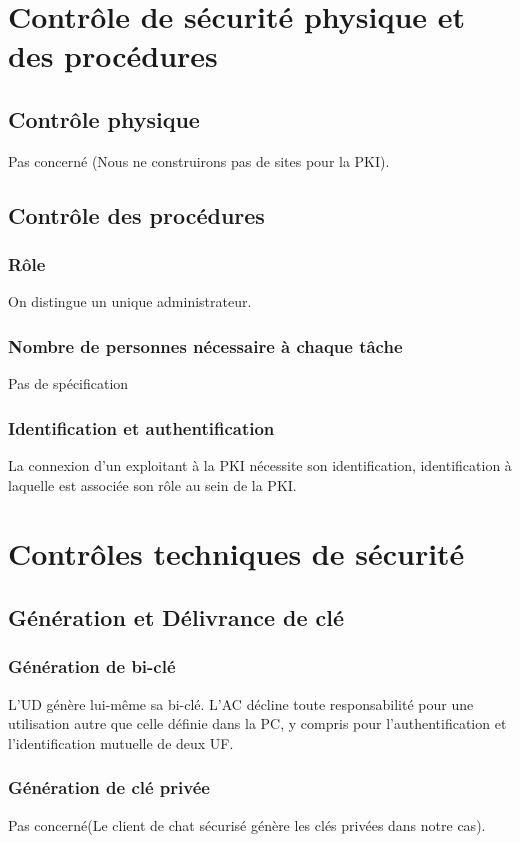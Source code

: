 \documentclass[a4paper,11pt,french]{article}
\begin{document}
\section{Contrôle de sécurité physique et des procédures}
\subsection{Contrôle physique}
Pas concerné (Nous ne construirons pas de sites pour la PKI).
\subsection{Contrôle des procédures}
\subsubsection{Rôle}
On distingue un unique administrateur.

\subsubsection{Nombre de personnes nécessaire à chaque tâche}
Pas de spécification

\subsubsection{Identification et authentification}
La connexion d'un exploitant à la PKI nécessite son identification, identification à laquelle est associée son rôle au sein de la PKI.

\section{Contrôles techniques de sécurité}

\subsection{Génération et Délivrance de clé}
\subsubsection{Génération de bi-clé}
L'UD génère lui-même sa bi-clé. L'AC décline toute responsabilité pour une utilisation autre que celle définie dans la PC, y
compris pour l'authentification et l'identification mutuelle de deux UF. 
\subsubsection{Génération de clé privée}
Pas concerné(Le client de chat sécurisé génère les clés privées dans notre cas).
\end{document}
